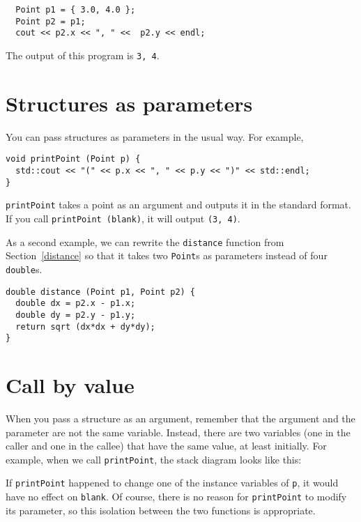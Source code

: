 \begin{verbatim}
  Point p1 = { 3.0, 4.0 };
  Point p2 = p1;
  cout << p2.x << ", " <<  p2.y << endl;
\end{verbatim}
%
The output of this program is {\tt 3, 4}.

\section{Structures as parameters}

You can pass structures as parameters in the usual way.  For
example,

\begin{verbatim}
void printPoint (Point p) {
  std::cout << "(" << p.x << ", " << p.y << ")" << std::endl;
}
\end{verbatim}
%
{\tt printPoint} takes a point as an argument and outputs it in
the standard format.  If you call {\tt printPoint (blank)},
it will output {\tt (3, 4)}.

As a second example, we can rewrite the {\tt distance} function from
Section~\ref{distance} so that it takes two {\tt Point}s as parameters
instead of four {\tt double}s.

\begin{verbatim}
double distance (Point p1, Point p2) {
  double dx = p2.x - p1.x;
  double dy = p2.y - p1.y;
  return sqrt (dx*dx + dy*dy);
}
\end{verbatim}

\section{Call by value}

When you pass a structure as an argument, remember that the
argument and the parameter are not the same variable.  Instead,
there are two variables (one in the caller and one in the
callee) that have the same value, at least initially.  For
example, when we call {\tt printPoint}, the stack diagram
looks like this:

\vspace{0.1in}
\centerline{}
\vspace{0.1in}
%
If {\tt printPoint} happened to change one of the instance variables
of {\tt p}, it would have no effect on {\tt blank}.  Of course, there
is no reason for {\tt printPoint} to modify its parameter, so this
isolation between the two functions is appropriate.

